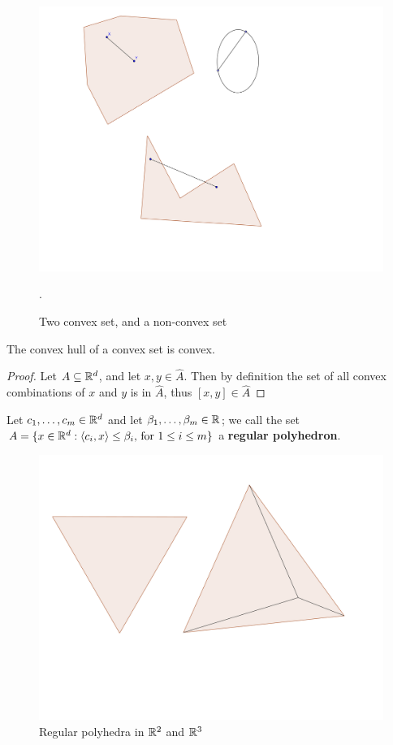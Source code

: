 \begin{figure}
    \centering
    \includegraphics[scale = 0.2]{Figures/convexSets.png}
    \caption{Two convex set, and a non-convex set}.
    \label{fig1.1}
\end{figure}

\begin{lemma}\label{1.1.1}
    The convex hull of a convex set is convex.
\end{lemma}
\begin{proof}
    Let $A \subseteq \mathbb{R}^d$, and let $x,y \in \hat{A}$. Then by definition the set of all convex 
    combinations of $x$ and  $y$ is in  $\hat{A}$, thus  $[x,y] \in \hat{A}$
\end{proof}

\begin{definition}
    Let $c_1, \dots, c_m \in \mathbb{R}^d$ and let $\beta_1, \dots, \beta_m \in \mathbb{R}$; we call the set 
    $A=\{x \in \mathbb{R}^d: \langle{c_i,x}\rangle \leq \beta_i \text{, for } 1 \leq i \leq m\}$ a 
    \textbf{ regular polyhedron}.
\end{definition}

\begin{figure} 
    \centering
    \includegraphics[scale = 0.3]{Figures/regularPolyhedra.png}
    \caption{Regular polyhedra in $\mathbb{R}^2$ and  $\mathbb{R}^3$}
\end{figure}

